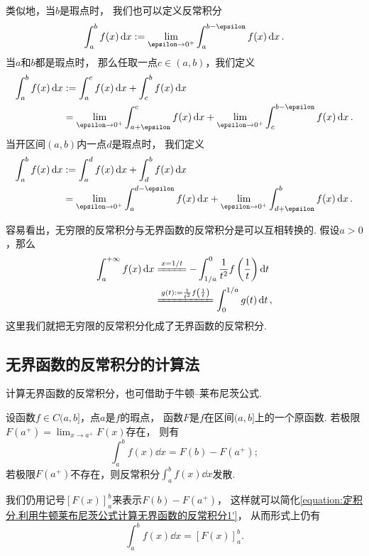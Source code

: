 类似地，当\(b\)是瑕点时，
我们也可以定义反常积分\begin{equation*}
	\int_a^b f(x) \dd{x}
	\defeq
	\lim_{\epsilon\to0^+} \int_a^{b-\epsilon} f(x) \dd{x}.
\end{equation*}
当\(a\)和\(b\)都是瑕点时，
那么任取一点\(c\in(a,b)\)，我们定义\begin{align*}
	\int_a^b f(x) \dd{x}
	&\defeq
	\int_a^c f(x) \dd{x}
	+ \int_c^b f(x) \dd{x} \\
	&= \lim_{\epsilon\to0^+} \int_{a+\epsilon}^c f(x) \dd{x}
	+ \lim_{\epsilon\to0^+} \int_c^{b-\epsilon} f(x) \dd{x}.
\end{align*}
当开区间\((a,b)\)内一点\(d\)是瑕点时，
我们定义\begin{align*}
	\int_a^b f(x) \dd{x}
	&\defeq \int_a^d f(x) \dd{x}
		+ \int_d^b f(x) \dd{x} \\
	&= \lim_{\epsilon\to0^+} \int_a^{d-\epsilon} f(x) \dd{x}
		+ \lim_{\epsilon\to0^+} \int_{d+\epsilon}^b f(x) \dd{x}.
\end{align*}

容易看出，无穷限的反常积分与无界函数的反常积分是可以互相转换的.
假设\(a>0\)，那么\begin{align*}
	\int_a^{+\infty} f(x) \dd{x}
	&\xlongequal{x=1/t}
	-\int_{1/a}^0 \frac1{t^2} f\left(\frac1t\right) \dd{t} \\
	&\xlongequal{g(t) \defeq \frac1{t^2} f\left(\frac1t\right)}
	\int_0^{1/a} g(t) \dd{t},
\end{align*}
这里我们就把无穷限的反常积分化成了无界函数的反常积分.

\subsection{无界函数的反常积分的计算法}
计算无界函数的反常积分，也可借助于牛顿--莱布尼茨公式.
\begin{theorem}\label{theorem:定积分.利用牛顿莱布尼茨公式计算无界函数的反常积分1}
设函数\(f \in C(a,b]\)，点\(a\)是\(f\)的瑕点，
函数\(F\)是\(f\)在区间\((a,b]\)上的一个原函数.
若极限\(F(a^+) = \lim_{x \to a^+} F(x)\)存在，
则有
\begin{equation}\label{equation:定积分.利用牛顿莱布尼茨公式计算无界函数的反常积分1'}
	\int_a^b f(x) \dd{x}
	= F(b) - F(a^+);
\end{equation}
若极限\(F(a^+)\)不存在，则反常积分\(\int_a^b f(x) \dd{x}\)发散.
\end{theorem}
我们仍用记号\([F(x)]_a^b\)来表示\(F(b) - F(a^+)\)，
这样就可以简化\cref{equation:定积分.利用牛顿莱布尼茨公式计算无界函数的反常积分1'}，
从而形式上仍有
\begin{equation}\label{equation:定积分.利用牛顿莱布尼茨公式计算无界函数的反常积分1}
	\int_a^b f(x) \dd{x} = [F(x)]_a^b.
\end{equation}

